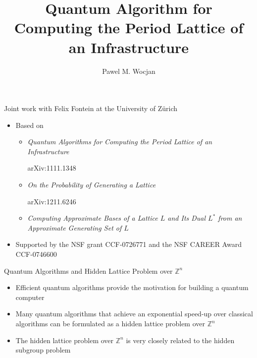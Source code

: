 \documentclass{beamer}
\newcommand{\Z}{\mathbb{Z}}
\renewcommand{\>}{\rangle}
\newcommand{\<}{\langle}
\begin{document}

\title{Quantum Algorithm for Computing the Period Lattice of an Infrastructure}
\author{Pawel M. Wocjan}
\date{}


\begin{frame}

\titlepage

\end{frame}


\begin{frame}{Joint work with Felix Fontein at the University of Z\"urich}

\begin{itemize}

\medskip
\item Based on 

\medskip
\begin{itemize}
\item \emph{Quantum Algorithms for Computing the Period Lattice of an Infrastructure}

 arXiv:1111.1348

\medskip
\item \emph{On the Probability of Generating a Lattice}

arXiv:1211.6246

\medskip
\item \emph{Computing Approximate Bases of a Lattice $L$ and Its Dual $L^*$ from an Approximate Generating Set of $L$}
\end{itemize}

\medskip
\item Supported by the NSF grant CCF-0726771 and the NSF CAREER Award CCF-0746600
\end{itemize}
\end{frame}



\begin{frame}{Quantum Algorithms and Hidden Lattice Problem over $\Z^n$}

\begin{itemize}
\item Efficient quantum algorithms provide the motivation for building a quantum computer

\medskip
\item Many quantum algorithms that achieve an exponential speed-up over classical algorithms can be formulated as a hidden lattice problem over $\Z^n$ 

\medskip
\item The hidden lattice problem over $\Z^n$ is very closely related to the hidden subgroup problem

\end{itemize}
\end{frame}
\end{document}
